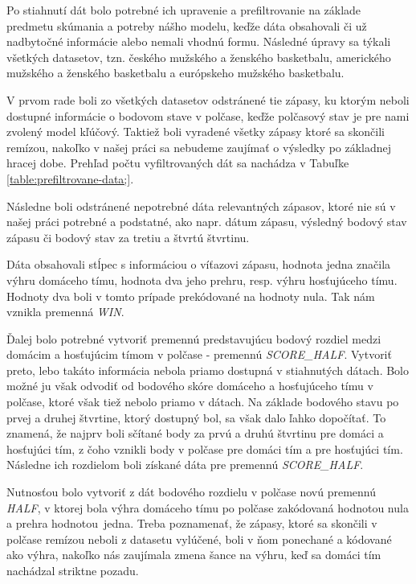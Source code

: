 \documentclass[
  digital, %
  oneside, %
  notable,   %
  lof,     %
  lot,     %
]{fithesis3}
\begin{document}
		Po stiahnutí dát bolo potrebné ich upravenie a prefiltrovanie na základe predmetu skúmania a potreby nášho modelu, keďže dáta obsahovali či už nadbytočné informácie alebo nemali vhodnú formu. Následné úpravy sa týkali všetkých datasetov, tzn. českého mužského a ženského basketbalu, amerického mužského a ženského basketbalu a európskeho mužského basketbalu.
		
		V prvom rade boli zo všetkých datasetov odstránené tie zápasy, ku ktorým neboli dostupné informácie o bodovom stave v polčase, keďže polčasový stav je pre nami zvolený model kľúčový. Taktiež boli vyradené všetky zápasy ktoré sa skončili remízou, nakoľko v našej práci sa nebudeme zaujímať o výsledky po základnej hracej dobe. Prehľad počtu vyfiltrovaných dát sa nachádza v Tabuľke \ref{table:prefiltrovane-data;}.
		
		Následne boli odstránené nepotrebné dáta relevantných zápasov, ktoré nie sú v našej práci potrebné a podstatné, ako napr. dátum zápasu, výsledný bodový stav zápasu či bodový stav za tretiu a štvrtú štvrtinu.
		
		Dáta obsahovali stĺpec s informáciou o víťazovi zápasu, hodnota jedna značila výhru domáceho tímu, hodnota dva jeho prehru, resp. výhru hosťujúceho tímu. Hodnoty dva boli v tomto prípade prekódované na hodnoty nula. Tak nám vznikla premenná \textit{WIN}.
		
		Ďalej bolo potrebné vytvoriť premennú predstavujúcu bodový rozdiel medzi domácim a hosťujúcim tímom v polčase - premennú \textit{SCORE\_HALF}. Vytvoriť preto, lebo takáto informácia nebola priamo dostupná v stiahnutých dátach. Bolo možné ju však odvodiť od  bodového skóre domáceho a hosťujúceho tímu v polčase, ktoré však tiež nebolo priamo v dátach. Na základe bodového stavu po prvej a druhej štvrtine, ktorý dostupný bol, sa však dalo ľahko dopočítať. To znamená, že najprv boli sčítané body za prvú a druhú štvrtinu pre domáci a hosťujúci tím, z čoho vznikli body v polčase pre domáci tím a pre hosťujúci tím. Následne ich rozdielom boli získané dáta pre premennú \textit{SCORE\_HALF}. 
		
		Nutnosťou bolo vytvoriť z dát bodového rozdielu v polčase novú premennú \textit{HALF}, v ktorej bola výhra domáceho tímu po polčase zakódovaná hodnotou nula a prehra hodnotou~jedna. Treba poznamenať, že zápasy, ktoré sa skončili v polčase remízou neboli z datasetu vylúčené, boli v ňom ponechané a kódované ako výhra, nakoľko nás zaujímala zmena šance na výhru, keď sa domáci tím nachádzal striktne pozadu.
		
\end{document}
